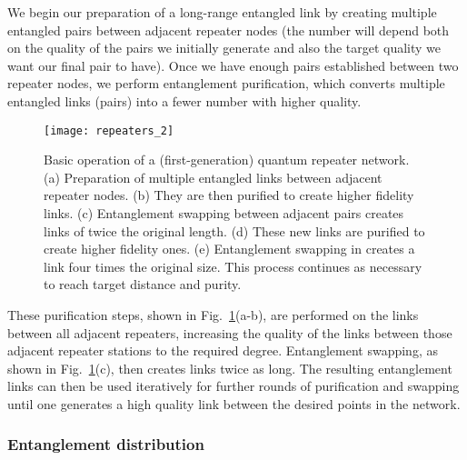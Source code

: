 We begin our preparation of a long-range entangled link by creating multiple entangled pairs between adjacent repeater nodes (the number will depend both on the quality of the pairs we initially generate and also the target quality we want our final pair to have). Once we have enough pairs established between two repeater nodes, we perform entanglement purification, which converts multiple entangled links (pairs) into a fewer number with higher quality. 

\begin{figure}[!htbp]
\texttt{[image: repeaters\_2]}
\captionspacefig \caption{Basic operation of a (first-generation) quantum repeater network. (a) Preparation of multiple entangled links between adjacent repeater nodes. (b) They are then purified to create higher fidelity links. (c) Entanglement swapping between adjacent pairs creates links of twice the original length. (d) These new links are purified to create higher fidelity ones. (e) Entanglement swapping in creates a link four times the original size. This process continues as necessary to reach target distance and purity.} 
\label{fig:repeaters_2}
\end{figure} 

These purification steps, shown in Fig.~\ref{fig:repeaters_2}(a-b), are performed on the links between all adjacent repeaters, increasing the quality of the links between those adjacent repeater stations to the required degree. Entanglement swapping, as shown in Fig.~\ref{fig:repeaters_2}(c), then creates links twice as long. The resulting entanglement links can then be used iteratively for further rounds of purification and swapping until one generates a high quality link between the desired points in the network. 

\subsubsection{Entanglement distribution}\label{sec:reps_ent_dist}

